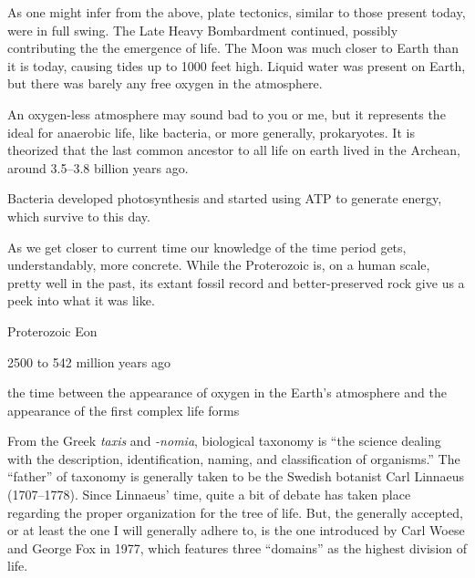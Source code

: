 \documentclass[./butidigress.tex]{subfiles}
\begin{document}
As one might infer from the above, plate tectonics, similar to those present today, were in full swing.
The Late Heavy Bombardment continued, possibly contributing the the emergence of life.
The Moon was much closer to Earth than it is today, causing tides up to \num{1000} feet high.
Liquid water was present on Earth, but there was barely any free oxygen in the atmosphere.

An oxygen-less atmosphere may sound bad to you or me, but it represents the ideal for anaerobic life, like bacteria, or more generally, prokaryotes.
It is theorized that the last common ancestor to all life on earth lived in the Archean, around \numrange{3.5}{3.8} billion years ago.

Bacteria developed photosynthesis and started using ATP to generate energy, which survive to this day.

As we get closer to current time our knowledge of the time period gets, understandably, more concrete.
While the Proterozoic is, on a human scale, pretty well in the past, its extant fossil record and better-preserved rock give us a peek into what it was like.

\begin{somenotes}{Proterozoic Eon}
    \item \num{2500} to \num{542} million years ago
    \item the time between the appearance of oxygen in the Earth's atmosphere and the appearance of the first complex life forms
\end{somenotes}

From the Greek \emph{taxis} and \emph{-nomia}, biological taxonomy is \enquote{the science dealing with the description, identification, naming, and classification of organisms.}
The \enquote{father} of taxonomy is generally taken to be the Swedish botanist Carl Linnaeus (1707--1778).
Since Linnaeus' time, quite a bit of debate has taken place regarding the proper organization for the tree of life.\autocite{phylogenyandbeyond}
But, the generally accepted, or at least the one I will generally adhere to, is the one introduced by Carl Woese and George Fox in 1977, which features three \enquote{domains} as the highest division of life.\autocite{woeseorignial}
\end{document}
